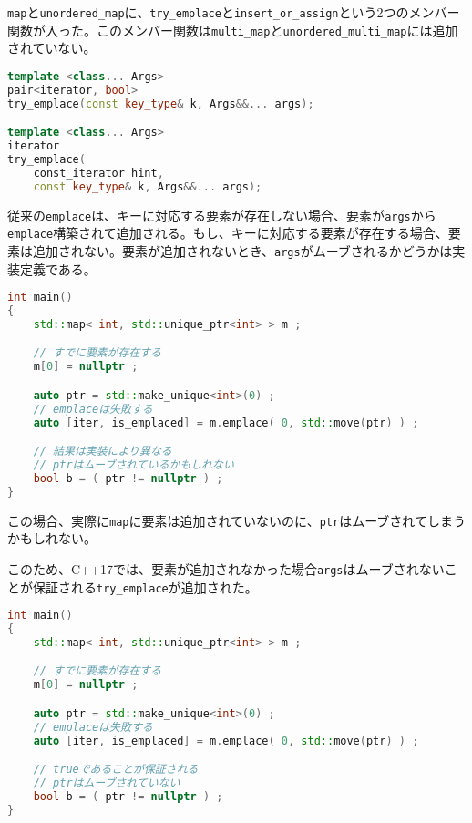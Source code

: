 %

\lstinline!map!と\lstinline!unordered_map!に、\lstinline!try_emplace!と\lstinline!insert_or_assign!という2つのメンバー関数が入った。このメンバー関数は\lstinline!multi_map!と\lstinline!unordered_multi_map!には追加されていない。

%

\bgroup
\begin{lstlisting}[language=C++]
template <class... Args>
pair<iterator, bool>
try_emplace(const key_type& k, Args&&... args);

template <class... Args>
iterator
try_emplace(
    const_iterator hint,
    const key_type& k, Args&&... args);
\end{lstlisting}
\egroup

従来の\lstinline!emplace!は、キーに対応する要素が存在しない場合、要素が\lstinline!args!から\lstinline!emplace!構築されて追加される。もし、キーに対応する要素が存在する場合、要素は追加されない。要素が追加されないとき、\lstinline!args!がムーブされるかどうかは実装定義である。

\begin{lstlisting}[language=C++]
int main()
{
    std::map< int, std::unique_ptr<int> > m ;

    // すでに要素が存在する
    m[0] = nullptr ;

    auto ptr = std::make_unique<int>(0) ;
    // emplaceは失敗する
    auto [iter, is_emplaced] = m.emplace( 0, std::move(ptr) ) ;

    // 結果は実装により異なる
    // ptrはムーブされているかもしれない
    bool b = ( ptr != nullptr ) ;
}
\end{lstlisting}

この場合、実際に\lstinline!map!に要素は追加されていないのに、\lstinline!ptr!はムーブされてしまうかもしれない。

このため、C++17では、要素が追加されなかった場合\lstinline!args!はムーブされないことが保証される\lstinline!try_emplace!が追加された。

\begin{lstlisting}[language=C++]
int main()
{
    std::map< int, std::unique_ptr<int> > m ;

    // すでに要素が存在する
    m[0] = nullptr ;

    auto ptr = std::make_unique<int>(0) ;
    // emplaceは失敗する
    auto [iter, is_emplaced] = m.emplace( 0, std::move(ptr) ) ;

    // trueであることが保証される
    // ptrはムーブされていない
    bool b = ( ptr != nullptr ) ;
}
\end{lstlisting}

